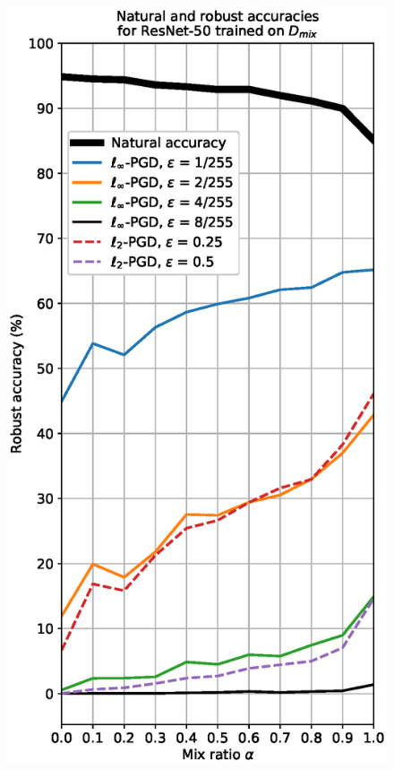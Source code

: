 \begin{figure}[htb]
    \vspace{-7pt}
    \begin{center}
        \begin{minipage}[b]{0.235\textwidth}
            \includegraphics[width=\textwidth]{figs/Q2_resnet.eps}

\end{minipage}
\end{center}
\end{figure}
